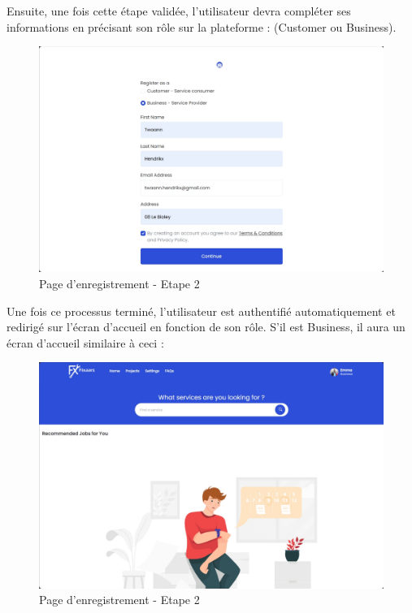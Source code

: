Ensuite, une fois cette étape validée, l'utilisateur devra compléter ses informations en précisant son rôle sur la plateforme : (Customer ou Business).

\begin{figure}[H]
\begin{center}
\includegraphics[width=12cm]{assets/demo/signup-2.png}
\end{center}
\caption{Page d'enregistrement - Etape 2}
\end{figure}

Une fois ce processus terminé, l'utilisateur est authentifié automatiquement et redirigé sur l'écran d'accueil en fonction de son rôle. S'il est Business, il aura un écran d'accueil similaire à ceci :

\vspace{0.35cm}
\begin{figure}[H]
\begin{center}
\includegraphics[width=12cm]{assets/demo/sp1.png}
\end{center}
\caption{Page d'enregistrement - Etape 2}
\end{figure}

